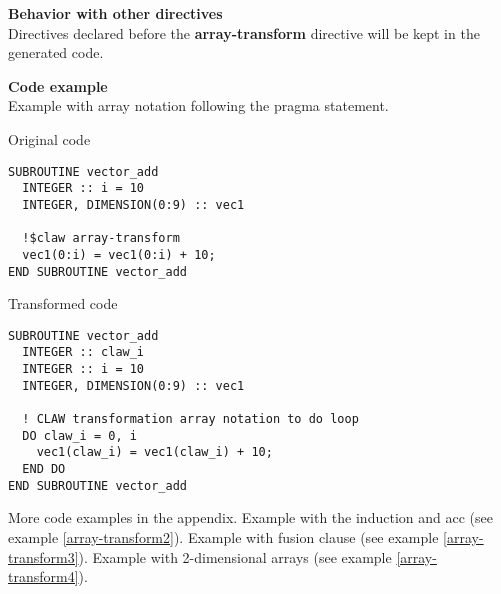 \textbf{Behavior with other directives}\\
Directives declared before the \textbf{array-transform} directive will be kept in the
generated code.

\textbf{Code example}\\
\label{array-transform1}
Example with array notation following the pragma statement. 

Original code
\begin{lstlisting}
SUBROUTINE vector_add
  INTEGER :: i = 10
  INTEGER, DIMENSION(0:9) :: vec1

  !$claw array-transform
  vec1(0:i) = vec1(0:i) + 10;
END SUBROUTINE vector_add
\end{lstlisting}

Transformed code
\begin{lstlisting}
SUBROUTINE vector_add
  INTEGER :: claw_i
  INTEGER :: i = 10
  INTEGER, DIMENSION(0:9) :: vec1

  ! CLAW transformation array notation to do loop
  DO claw_i = 0, i
    vec1(claw_i) = vec1(claw_i) + 10;
  END DO
END SUBROUTINE vector_add
\end{lstlisting}

More code examples in the appendix. Example with the induction and acc (see example \ref{array-transform2}). Example with fusion clause (see example \ref{array-transform3}). Example with 2-dimensional arrays (see example \ref{array-transform4}). 
